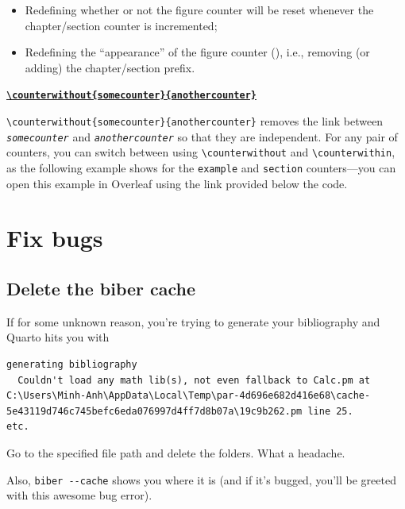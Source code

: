 \documentclass[
  letterpaper,
  DIV=11,
  numbers=noendperiod]{scrreprt}
\begin{document}
\begin{itemize}
\item
  Redefining whether or not the figure counter will be reset whenever
  the chapter/section counter is incremented;
\item
  Redefining the ``appearance'' of the figure counter (\thefigure),
  i.e., removing (or adding) the chapter/section prefix.
\end{itemize}

\href{https://www.overleaf.com/learn/latex/Counters\#.5Ccounterwithout.7Bsomecounter.7D.7Banothercounter.7D}{\textbf{\texttt{\textbackslash{}counterwithout\{somecounter\}\{anothercounter\}}}}

\texttt{\textbackslash{}counterwithout\{somecounter\}\{anothercounter\}}
removes the link between \emph{\texttt{somecounter}} and
\emph{\texttt{anothercounter}} so that they are independent. For any
pair of counters, you can switch between using
\texttt{\textbackslash{}counterwithout} and
\texttt{\textbackslash{}counterwithin}, as the following example shows
for the \texttt{example} and \texttt{section} counters---you can open
this example in Overleaf using the link provided below the code.


\hypertarget{fix-bugs}{%
\chapter{Fix bugs}\label{fix-bugs}}

\hypertarget{delete-the-biber-cache}{%
\section{Delete the biber cache}\label{delete-the-biber-cache}}

If for some unknown reason, you're trying to generate your bibliography
and Quarto hits you with

\begin{verbatim}
generating bibliography
  Couldn't load any math lib(s), not even fallback to Calc.pm at C:\Users\Minh-Anh\AppData\Local\Temp\par-4d696e682d416e68\cache-5e43119d746c745befc6eda076997d4ff7d8b07a\19c9b262.pm line 25.
etc.
\end{verbatim}

Go to the specified file path and delete the folders. What a headache.

Also, \texttt{biber\ -\/-cache} shows you where it is (and if it's
bugged, you'll be greeted with this awesome bug error).
\end{document}
